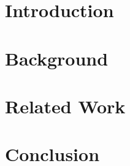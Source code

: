 \documentclass[conference]{IEEEtran}
\begin{document}
\section{Introduction}

\section{Background}

\section{Related Work}

\section{Conclusion}


\nocite{*}



\end{document}
